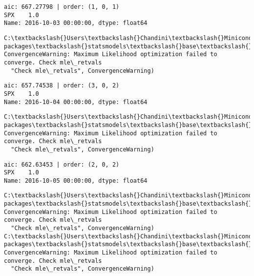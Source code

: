 \documentclass[11pt]{article}
\begin{document}
    \begin{Verbatim}[commandchars=\\\{\}]
aic: 667.27798 | order: (1, 0, 1)
SPX    1.0
Name: 2016-10-03 00:00:00, dtype: float64

    \end{Verbatim}

    \begin{Verbatim}[commandchars=\\\{\}]
C:\textbackslash{}Users\textbackslash{}Chandini\textbackslash{}Miniconda3\textbackslash{}envs\textbackslash{}auquan\textbackslash{}lib\textbackslash{}site-packages\textbackslash{}statsmodels\textbackslash{}base\textbackslash{}model.py:496: ConvergenceWarning: Maximum Likelihood optimization failed to converge. Check mle\_retvals
  "Check mle\_retvals", ConvergenceWarning)

    \end{Verbatim}

    \begin{Verbatim}[commandchars=\\\{\}]
aic: 657.74538 | order: (3, 0, 2)
SPX    1.0
Name: 2016-10-04 00:00:00, dtype: float64

    \end{Verbatim}

    \begin{Verbatim}[commandchars=\\\{\}]
C:\textbackslash{}Users\textbackslash{}Chandini\textbackslash{}Miniconda3\textbackslash{}envs\textbackslash{}auquan\textbackslash{}lib\textbackslash{}site-packages\textbackslash{}statsmodels\textbackslash{}base\textbackslash{}model.py:496: ConvergenceWarning: Maximum Likelihood optimization failed to converge. Check mle\_retvals
  "Check mle\_retvals", ConvergenceWarning)

    \end{Verbatim}

    \begin{Verbatim}[commandchars=\\\{\}]
aic: 662.63453 | order: (2, 0, 2)
SPX    1.0
Name: 2016-10-05 00:00:00, dtype: float64

    \end{Verbatim}

    \begin{Verbatim}[commandchars=\\\{\}]
C:\textbackslash{}Users\textbackslash{}Chandini\textbackslash{}Miniconda3\textbackslash{}envs\textbackslash{}auquan\textbackslash{}lib\textbackslash{}site-packages\textbackslash{}statsmodels\textbackslash{}base\textbackslash{}model.py:496: ConvergenceWarning: Maximum Likelihood optimization failed to converge. Check mle\_retvals
  "Check mle\_retvals", ConvergenceWarning)
C:\textbackslash{}Users\textbackslash{}Chandini\textbackslash{}Miniconda3\textbackslash{}envs\textbackslash{}auquan\textbackslash{}lib\textbackslash{}site-packages\textbackslash{}statsmodels\textbackslash{}base\textbackslash{}model.py:496: ConvergenceWarning: Maximum Likelihood optimization failed to converge. Check mle\_retvals
  "Check mle\_retvals", ConvergenceWarning)

    \end{Verbatim}
\end{document}
